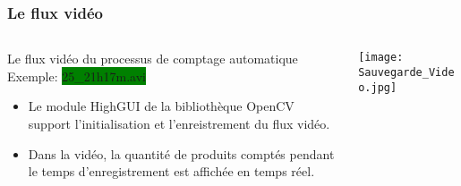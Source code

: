 \documentclass{beamer}
\begin{document}
\begin{frame}
\frametitle{Le flux vidéo}
\begin{columns}

\begin{column}{0.70\textwidth}
\begin{exampleblock}{Le flux vidéo du processus de comptage automatique}
	Exemple: \colorbox{green}{25\_21h\textendash 17m.avi} 
\end{exampleblock}
\smallskip

\begin{itemize}
\item Le module HighGUI de la bibliothèque OpenCV support l'initialisation et l'enreistrement du flux vidéo.\\

\smallskip
\item Dans la vidéo, la quantité de produits comptés pendant le temps d'enregistrement est affichée en temps réel. 
\end{itemize}
\end{column}

\begin{column}{0.30\textwidth}
\centering
    \texttt{[image: Sauvegarde\_Video.jpg]}
\end{column}

\end{columns}
\end{frame}
\end{document}

